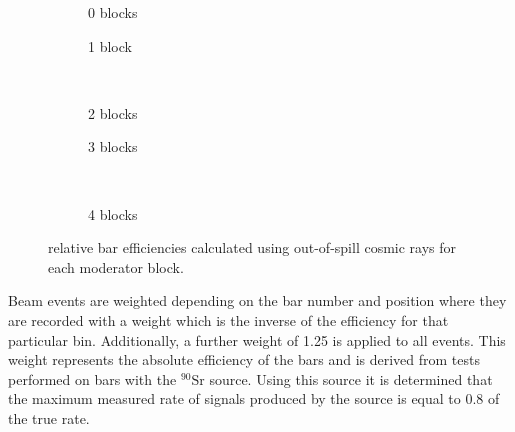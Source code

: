 \begin{figure}[t]
  \begin{subfigure}[t]{.5\textwidth}
    \begin{adjustbox}{max totalsize=\textwidth, center}
      
    \end{adjustbox}
    \caption{0 blocks}
  \end{subfigure}
  \hfill
  \begin{subfigure}[t]{.5\textwidth}
    \begin{adjustbox}{max totalsize=\textwidth, center}
            
    \end{adjustbox}
    \caption{1 block}
  \end{subfigure} \\
  \begin{subfigure}[t]{.5\textwidth}
    \begin{adjustbox}{max totalsize=\textwidth, center}
      
    \end{adjustbox}
    \caption{2 blocks}
  \end{subfigure}
  \hfill
  \begin{subfigure}[t]{.5\textwidth}
    \begin{adjustbox}{max totalsize=\textwidth, center}
      
    \end{adjustbox}
    \caption{3 blocks}
  \end{subfigure} \\

  \begin{subfigure}[t]{\textwidth}
    \begin{adjustbox}{max totalsize=.5\textwidth, center}
      
    \end{adjustbox}
    \caption{4 blocks}
  \end{subfigure}

  \caption[\SFour relative bar efficiencies]{\SFour relative bar efficiencies calculated using out-of-spill cosmic rays for each moderator block.}
  \label{fig:barEff}
\end{figure}

Beam events are weighted depending on the bar number and position where they are recorded with a weight which is the inverse of the efficiency for that particular bin.
Additionally, a further weight of \num{1.25} is applied to all events.
This weight represents the absolute efficiency of the bars and is derived from tests performed on \SFour bars with the $^{90}\text{Sr}$ source.
Using this source it is determined that the maximum measured rate of signals produced by the source is equal to \num{0.8} of the true rate.


